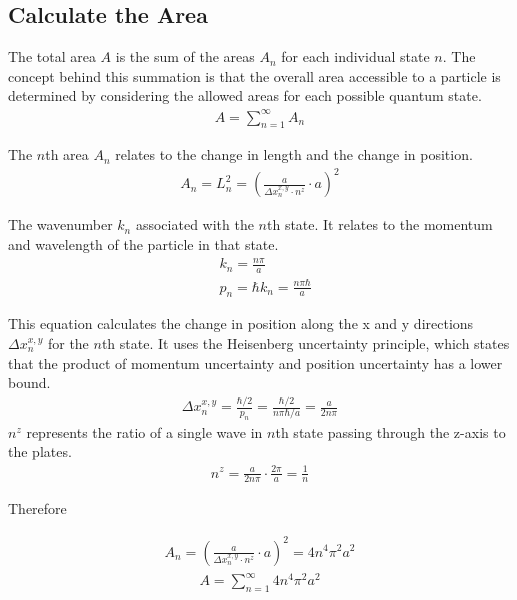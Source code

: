 \documentclass[aip,apl,amsmath,amssymb,reprint]{revtex4-2}
\begin{document}
\subsection*{Calculate the Area}

The total area $A$ is the sum of the areas $A_n$ for each individual state $n$.
The concept behind this summation is that the overall area accessible to 
a particle is determined by considering the allowed areas for each possible quantum state.
\begin{align}
    A = \sum_{n=1}^{\infty}A_n
\end{align}

    The $n$th area $A_n$ relates to the change in length and the change in position.
    \begin{align}
        A_n = L_n^2 = (\frac{a}{\Delta x_n^{x,y} \cdot n^z} \cdot a)^2
    \end{align}

    The wavenumber $k_n$ associated with the $n$th state. It relates to the momentum and wavelength of the particle in that state.
    \begin{align}
        &k_n = \frac{n \pi}{a} \\
        &p_n = \hbar k_n = \frac{n \pi \hbar}{a}
    \end{align}

    This equation calculates the change in position along the x and y directions $\Delta x_n^{x,y}$ for the $n$th state. 
It uses the Heisenberg uncertainty principle, which states that the product of momentum uncertainty and position uncertainty 
has a lower bound.
    \begin{align}
        \Delta x_n^{x, y} = \frac{\hbar/2}{p_n} = \frac{\hbar/2}{n \pi \hbar/a} = \frac{a}{2 n \pi}
    \end{align}
$n^z$ represents the ratio of a single wave in $n$th state passing through the z-axis to the plates.
    \begin{align}
        n^z = \frac{a}{2 n \pi} \cdot \frac{2 \pi}{a} =\frac{1}{n}
    \end{align}
    
Therefore

    \begin{align}
        A_n = (\frac{a}{\Delta x_n^{x,y} \cdot n^z} \cdot a)^2 = 4 n^4 \pi^2 a^2
    \end{align}
    \begin{align}
        A = \sum_{n=1}^{\infty}4 n^4 \pi^2 a^2
    \end{align}
\end{document}
